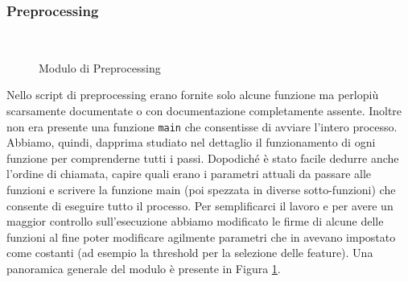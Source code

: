 \subsubsection{Preprocessing}~\newline
\begin{figure}[hbpt!]
		\centering
		
  		\caption{Modulo di Preprocessing}
        \label{fig:preprocessing_module}
\end{figure}
Nello script di preprocessing erano fornite solo alcune funzione ma perlopiù scarsamente documentate o con documentazione
completamente assente. Inoltre non era presente una funzione \texttt{main} che consentisse di avviare l'intero processo.
Abbiamo, quindi, dapprima studiato nel dettaglio il funzionamento di ogni funzione per comprenderne tutti i passi.
Dopodiché è stato facile dedurre anche l'ordine di chiamata, capire quali erano i parametri attuali da passare
alle funzioni e scrivere la funzione main (poi spezzata in diverse sotto-funzioni) che consente di eseguire tutto il
processo.
Per semplificarci il lavoro e per avere un maggior controllo sull'esecuzione abbiamo modificato le firme
di alcune delle funzioni al fine poter modificare agilmente parametri che in \cite{lyu2018deep} avevano impostato 
come costanti (ad esempio la threshold per la selezione delle feature). Una panoramica generale del modulo è presente 
in Figura \ref{fig:preprocessing_module}.

